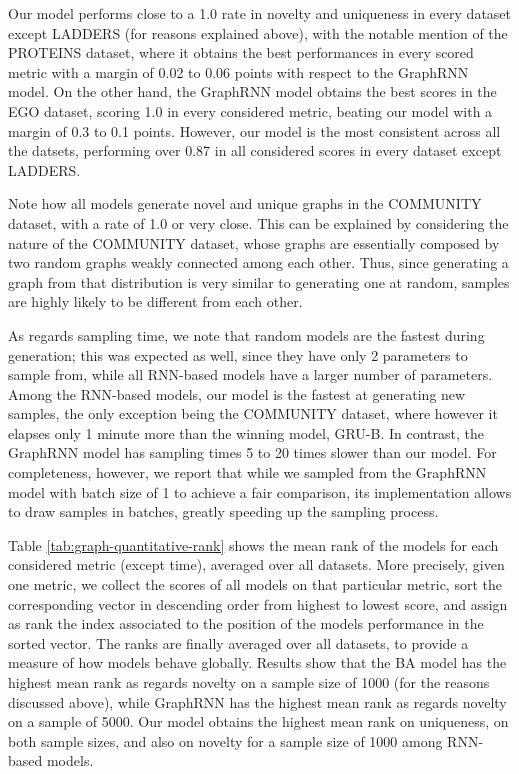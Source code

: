 Our model performs close to a 1.0 rate in novelty and uniqueness in every dataset except LADDERS (for reasons explained above), with the notable mention of the PROTEINS dataset, where it obtains the best performances in every scored metric with a margin of 0.02 to 0.06 points with respect to the GraphRNN model. On the other hand, the GraphRNN model obtains the best scores in the EGO dataset, scoring 1.0 in every considered metric, beating our model with a margin of 0.3 to 0.1 points. However, our model is the most consistent across all the datsets, performing over 0.87 in all considered scores in every dataset except LADDERS.

Note how all models generate novel and unique graphs in the COMMUNITY dataset, with a rate of 1.0 or very close. This can be explained by considering the nature of the COMMUNITY dataset, whose graphs are essentially composed by two random graphs weakly connected among each other. Thus, since generating a graph from that distribution is very similar to generating one at random, samples are highly likely to be different from each other.

As regards sampling time, we note that random models are the fastest during generation; this was expected as well, since they have only 2 parameters to sample from, while all RNN-based models have a larger number of parameters. Among the RNN-based models, our model is the fastest at generating new samples, the only exception being the COMMUNITY dataset, where however it elapses only 1 minute more than the winning model, GRU-B. In contrast, the GraphRNN model has sampling times 5 to 20 times slower than our model. For completeness, however, we report that while we sampled from the GraphRNN model with batch size of 1 to achieve a fair comparison, its implementation allows to draw samples in batches, greatly speeding up the sampling process.

Table \ref{tab:graph-quantitative-rank} shows the mean rank of the models for each considered metric (except time), averaged over all datasets. More precisely, given one metric, we collect the scores of all models on that particular metric, sort the corresponding vector in descending order from highest to lowest score, and assign as rank the index associated to the position of the models performance in the sorted vector. The ranks are finally averaged over all datasets, to provide a measure of how models behave globally. Results show that the BA model has the highest mean rank as regards novelty on a sample size of 1000 (for the reasons discussed above), while GraphRNN has the highest mean rank as regards novelty on a sample of 5000. Our model obtains the highest mean rank on uniqueness, on both sample sizes, and also on novelty for a sample size of 1000 among RNN-based models.


